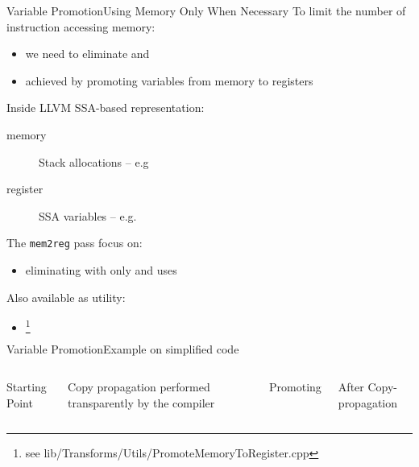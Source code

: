 \documentclass[10pt,mathserif]{beamer}
\begin{document}
\begin{frame}{Variable Promotion}{Using Memory Only When Necessary}
To limit the number of instruction accessing memory:

\begin{itemize}
\item we need to eliminate  and 
\item achieved by \alert{promoting} variables from memory to registers
\end{itemize}

\vfill
Inside LLVM SSA-based representation:

\begin{description}
\item[memory] Stack allocations --
              e.g 
\item[register] SSA variables -- e.g. 
\end{description}

\vfill
The \texttt{mem2reg} pass focus on:

\begin{itemize}
\item eliminating  with only  and
       uses
\end{itemize}

Also available as utility:

\begin{itemize}
\item {}\footnote{see lib/Transforms/Utils/PromoteMemoryToRegister.cpp}
\end{itemize}
\end{frame}

\begin{frame}{Variable Promotion}{Example on simplified code}
\begin{columns}[t]
\begin{block}{Starting Point}
\centering
{}
\end{block}

Copy propagation performed transparently by the compiler

\begin{block}{Promoting }
\centering
{}
\end{block}

\begin{block}{After Copy-propagation}
\centering
{}
\end{block}

\end{columns}
\end{frame}
\end{document}
